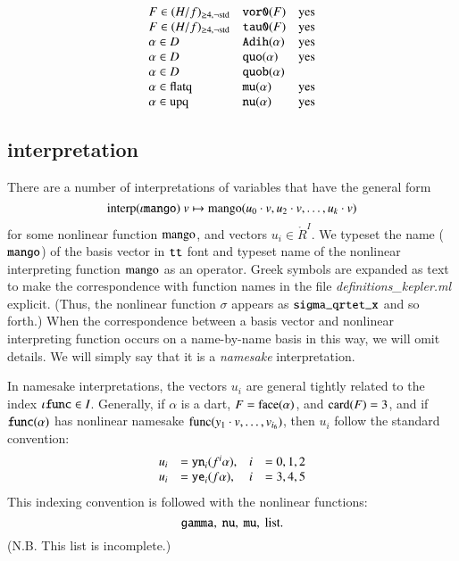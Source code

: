 \begin{definition}
$$\begin{array}{llll}
        F\in (H/f)_{\ge4,\neg{\operatorname{std}}}
        &{\operatorname{{\texttt{vor0}}}}(F)
        &\text{yes}\\
        F\in (H/f)_{\ge4,\neg{\operatorname{std}}}
        &{\operatorname{{\texttt{tau0}}}}(F)
        &\text{yes}\\
        \alpha\in D
        &{\operatorname{{\texttt{Adih}}}}(\alpha)
        &\text{yes}\\
        \alpha\in D
        &{\operatorname{{\texttt{quo}}}}(\alpha)
        &\text{yes}\\
        \alpha\in D
        &{\operatorname{{\texttt{quob}}}}(\alpha)
        &\\
        \alpha \in {\operatorname{flatq}}
        &{\operatorname{{\texttt{mu}}}}(\alpha)
        &\text{yes}\\
        \alpha\in {\operatorname{upq}}
        &{\operatorname{{\texttt{nu}}}}(\alpha)
        &\text{yes}\\
    \end{array}
    $$
\end{definition}

\subsection{interpretation}

There are a number of interpretations of variables that have the
general form
    $${\operatorname{interp}}(\iota{\operatorname{{\texttt{mango}}}})\ v\mapsto
    {\operatorname{mango}}(u_0\cdot v,u_2\cdot v,\ldots,u_k\cdot v)$$
for some nonlinear function ${\operatorname{mango}}$, and vectors $u_i\in
\ring{R}^I$.  We typeset the name (${\operatorname{{\texttt{mango}}}}$) of the basis
vector in ${\operatorname{{\texttt{tt}}}}$ font and typeset name of the nonlinear
interpreting function ${\operatorname{mango}}$ as an operator. Greek symbols
are expanded as text to make the correspondence with function
names in the file
    {\it definitions\_kepler.ml} explicit. (Thus, the nonlinear
    function $\sigma$ appears
    as ${\operatorname{{\texttt{sigma\_qrtet\_x}}}}$ and so forth.)
When the correspondence between a basis vector and nonlinear
interpreting function occurs on a name-by-name basis in this way,
we will omit details.  We will simply say that it is a {\it
namesake} interpretation.

In namesake interpretations, the vectors $u_i$ are general tightly
related to the index $\iota{\operatorname{{\texttt{func}}}}\in I$.  Generally, if
$\alpha$ is a dart, $F={\operatorname{face}}(\alpha)$,  and ${\operatorname{card}}(F)=3$, and
if ${\operatorname{{\texttt{func}}}}(\alpha)$ has nonlinear namesake
${\operatorname{func}}(y_1\cdot v,\ldots,v_{i_6})$, then $u_i$ follow the
standard convention:
    $$
    \begin{array}{llll}
    u_i &= {\operatorname{{\texttt{yn}}}}_i(f^i\alpha), &i &=0,1,2\\
    u_i &= {\operatorname{{\texttt{ye}}}}_i(f\alpha), &i &=3,4,5
    \end{array}
    $$
This indexing convention is followed with the nonlinear functions:
    $$
    {\operatorname{{\texttt{gamma}}}},\ {\operatorname{{\texttt{nu}}}},\ {\operatorname{{\texttt{mu}}}},\ \text{list.}
    $$
(N.B. This list is incomplete.)


